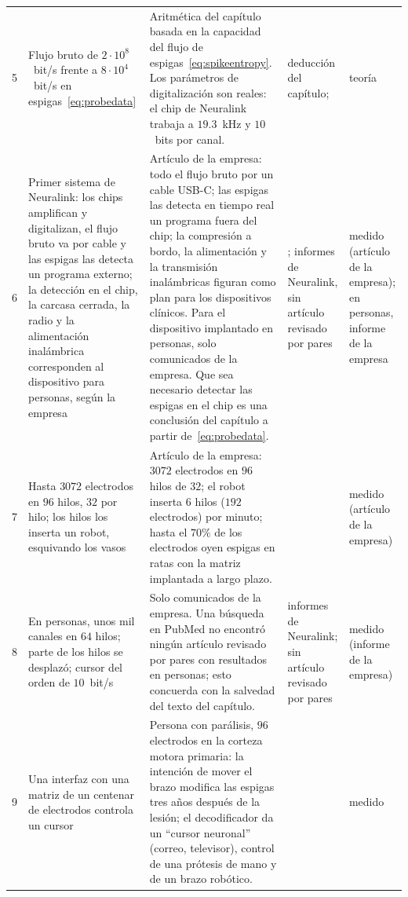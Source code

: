 {\begin{longtable}{>{\raggedright}p{0.5cm}>{\raggedright}p{4.0cm}>{\raggedright}p{5.6cm}>{\raggedright}p{2.3cm}>{\raggedright\arraybackslash}p{1.7cm}}
5 & Flujo bruto de $2\cdot10^8$~bit/s frente a $8\cdot10^4$~bit/s en espigas~\eqref{eq:probedata} & Aritmética del capítulo basada en la capacidad del flujo de espigas~\eqref{eq:spikeentropy}. Los parámetros de digitalización son reales: el chip de Neuralink trabaja a $19.3$~kHz y $10$~bits por canal. & deducción del capítulo; \cite{Rieke1997, Musk2019} & teoría \\
6 & Primer sistema de Neuralink: los chips amplifican y digitalizan, el flujo bruto va por cable y las espigas las detecta un programa externo; la detección en el chip, la carcasa cerrada, la radio y la alimentación inalámbrica corresponden al dispositivo para personas, según la empresa & Artículo de la empresa: todo el flujo bruto por un cable USB-C; las espigas las detecta en tiempo real un programa fuera del chip; la compresión a bordo, la alimentación y la transmisión inalámbricas figuran como plan para los dispositivos clínicos. Para el dispositivo implantado en personas, solo comunicados de la empresa. Que sea necesario detectar las espigas en el chip es una conclusión del capítulo a partir de~\eqref{eq:probedata}. & \cite{Musk2019}; informes de Neuralink, sin artículo revisado por pares & medido (artículo de la empresa); en personas, informe de la empresa \\
7 & Hasta $3072$ electrodos en $96$ hilos, $32$ por hilo; los hilos los inserta un robot, esquivando los vasos & Artículo de la empresa: $3072$ electrodos en $96$ hilos de $32$; el robot inserta $6$ hilos ($192$ electrodos) por minuto; hasta el $70\%$ de los electrodos oyen espigas en ratas con la matriz implantada a largo plazo. & \cite{Musk2019} & medido (artículo de la empresa) \\
8 & En personas, unos mil canales en $64$ hilos; parte de los hilos se desplazó; cursor del orden de $10$~bit/s & Solo comunicados de la empresa. Una búsqueda en PubMed no encontró ningún artículo revisado por pares con resultados en personas; esto concuerda con la salvedad del texto del capítulo. & informes de Neuralink; sin artículo revisado por pares & medido (informe de la empresa) \\
9 & Una interfaz con una matriz de un centenar de electrodos controla un cursor & Persona con parálisis, $96$ electrodos en la corteza motora primaria: la intención de mover el brazo modifica las espigas tres años después de la lesión; el decodificador da un “cursor neuronal” (correo, televisor), control de una prótesis de mano y de un brazo robótico. & \cite{Hochberg2006} & medido \\

\end{longtable}}
